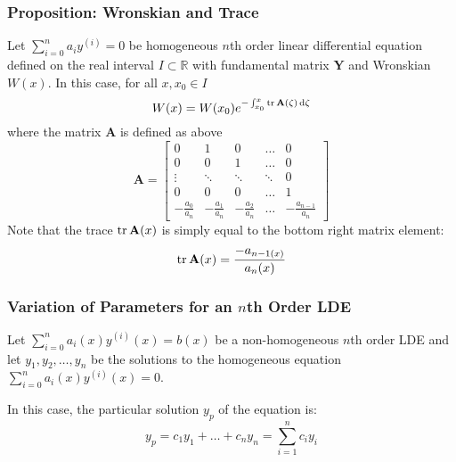 \documentclass[11pt, a4paper]{article}
\newcommand{\diff}{\mathop{}\!\mathrm{d}} %
\newcommand{\R}{\mathbb{R}} %
\begin{document}
\subsubsection{Proposition: Wronskian and Trace}
Let $ \sum_{i=0}^{n} a_i y^{(i)} = 0 $ be homogeneous $ n $th order linear differential equation defined on the real interval $ I \subset \R $ with fundamental matrix $ \mathbf{Y} $ and Wronskian $ W(x) $. In this case, for all $ x, x_0 \in I $
\begin{equation*}
	W(x) = W(x_0) e^{-\int_{x_0}^{x} \tr \mathbf{A}(\zeta) \diff \zeta }
\end{equation*}
where the matrix $ \mathbf{A} $ is defined as above
\[\mathbf{A} = 
\begin{bmatrix}
	0 & 1 & 0 & \dots & 0\\[1.0ex]
	0 & 0 & 1 & \dots & 0 \\[1.0ex]
	\vdots & \ddots & \ddots & \ddots & 0 \\[1.0ex]
	0 & 0 & 0 & \dots & 1 \\[1.0ex]
	- \frac{a_0}{a_n} & - \frac{a_1}{a_n} & - \frac{a_2}{a_n} & \dots & - \frac{a_{n-1}}{a_n}
\end{bmatrix}
\]
Note that the trace $ \tr \mathbf{A}(x) $ is simply equal to the bottom right matrix element:
\begin{equation*}
	\tr \mathbf{A}(x) = \frac{- a_{n-1 (x)}}{a_n (x)}
\end{equation*}

\subsubsection{Variation of Parameters for an $ n $th Order LDE}
Let $ \sum_{i = 0}^{n} a_i(x) y^{(i)}(x) = b(x) $ be a non-homogeneous $ n $th order LDE and let $ y_1, y_2, \dots, y_n $ be the solutions to the homogeneous equation $  \sum_{i = 0}^{n} a_i(x) y^{(i)}(x) = 0 $.

In this case, the particular solution $ y_p $ of the equation is:
\begin{equation*}
	y_p = c_1 y_1 + \dots + c_n y_n = \sum_{i = 1}^{n} c_{i} y_{i}
\end{equation*}
\end{document}
